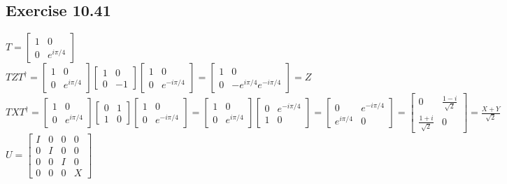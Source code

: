 \documentclass[a4paper,12pt]{article}
\begin{document}
\subsection*{Exercise 10.41}
$T=\begin{bmatrix}
    1&0\\
    0&e^{i\pi/4}
\end{bmatrix}$\\
$TZT^\dagger=\begin{bmatrix}
    1&0\\
    0&e^{i\pi/4}
\end{bmatrix}
\begin{bmatrix}
    1&0\\
    0&-1
\end{bmatrix}
\begin{bmatrix}
    1&0\\
    0&e^{-i\pi/4}
\end{bmatrix}=
\begin{bmatrix}
    1&0\\
    0&-e^{i\pi/4}e^{-i\pi/4}
\end{bmatrix}=Z$\\
$TXT^\dagger=\begin{bmatrix}
    1&0\\
    0&e^{i\pi/4}
\end{bmatrix}
\begin{bmatrix}
    0&1\\
    1&0
\end{bmatrix}
\begin{bmatrix}
    1&0\\
    0&e^{-i\pi/4}
\end{bmatrix}=
\begin{bmatrix}
    1&0\\
    0&e^{i\pi/4}
\end{bmatrix}
\begin{bmatrix}
    0&e^{-i\pi/4}\\
    1&0
\end{bmatrix}=
\begin{bmatrix}
    0&e^{-i\pi/4}\\
    e^{i\pi/4}&0
\end{bmatrix}=
\begin{bmatrix}
    0&\frac{1-i}{\sqrt{2}}\\
    \frac{1+i}{\sqrt{2}}&0
\end{bmatrix}=\frac{X+Y}{\sqrt{2}}$\\
$U=\begin{bmatrix}
    I&0&0&0\\
    0&I&0&0\\
    0&0&I&0\\
    0&0&0&X
\end{bmatrix}$\\
\end{document}
